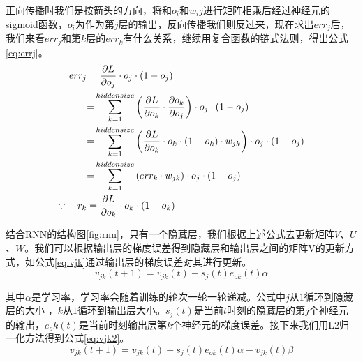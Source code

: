 正向传播时我们是按箭头的方向，将和$o_i$和${w_ij}$进行矩阵相乘后经过神经元的sigmoid函数，$o_i$为作为第$j$层的输出，反向传播我们则反过来，现在求出$err_j$后，我们来看$err_j$和第$k$层的$err_k$有什么关系，继续用复合函数的链式法则，得出公式\ref{eq:errj}。
\begin{equation}
	\label{eq:errj}
   	\begin{split}
er{r_j}&{\rm{ }} = \frac{{\partial L}}{{\partial {o_j}}} \cdot {o_j} \cdot \left( {1 - {o_j}} \right)\\
&{\rm{         = }}\sum\limits_{k = 1}^{hiddensize} {\left( {\frac{{\partial L}}{{\partial {o_k}}} \cdot \frac{{\partial {o_k}}}{{\partial {o_j}}}} \right)}  \cdot {o_j} \cdot \left( {1 - {o_j}} \right)\\
&{\rm{         = }}\sum\limits_{k = 1}^{hiddensize} {\left( {\frac{{\partial L}}{{\partial {o_k}}} \cdot {o_k} \cdot \left( {1 - {o_k}} \right) \cdot {w_{jk}}} \right)}  \cdot {o_j} \cdot \left( {1 - {o_j}} \right)\\
&{\rm{         = }}\sum\limits_{k = 1}^{hiddensize} {\left( {er{r_k} \cdot {w_{jk}}} \right)}  \cdot {o_j} \cdot \left( {1 - {o_j}} \right)\\
\because \quad {r_k}&{\rm{ }} = \frac{{\partial L}}{{\partial {o_k}}} \cdot {o_k} \cdot \left( {1 - {o_k}} \right)\\
\end{split}
\end{equation}

            
结合RNN的结构图\ref{fig:rnn}，只有一个隐藏层，我们根据上述公式去更新矩阵$V$、$U$、$W$。我们可以根据输出层的梯度误差得到隐藏层和输出层之间的矩阵V的更新方式，如公式\ref{eq:vjk}通过输出层的梯度误差对其进行更新。
\begin{equation}
	\label{eq:vjk}
   	{v_{jk}}\left( {t + 1} \right) = {v_{jk}}\left( t \right) + {s_j}\left( t \right){e_{ok}}\left( t \right)\alpha 
\end{equation}

其中$\alpha$是学习率，学习率会随着训练的轮次一轮一轮递减。公式中$j$从$1$循环到隐藏层的大小 ，$k$从$1$循环到输出层大小。${s_j}(t)$是当前$t$时刻的隐藏层的第$j$个神经元的输出，${e_ok}(t)$是当前时刻输出层第$k$个神经元的梯度误差。接下来我们用L2归一化方法得到公式\ref{eq:vjk2}。
\begin{equation}
	\label{eq:vjk2}
   {v_{jk}}\left( {t + 1} \right) = {v_{jk}}\left( t \right) + {s_j}\left( t \right){e_{ok}}\left( t \right)\alpha  - {v_{jk}}\left( t \right)\beta 
\end{equation}

